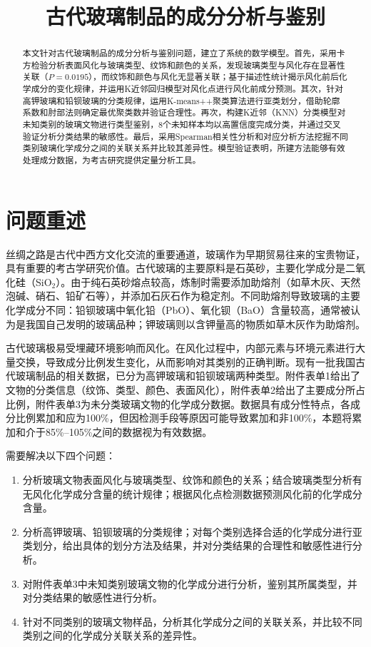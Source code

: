 \documentclass{cumcmthesis}
\title{古代玻璃制品的成分分析与鉴别}
\begin{document}
\maketitle

\begin{abstract}
本文针对古代玻璃制品的成分分析与鉴别问题，建立了系统的数学模型。首先，采用卡方检验分析表面风化与玻璃类型、纹饰和颜色的关系，发现玻璃类型与风化存在显著性关联（$P=0.0195$），而纹饰和颜色与风化无显著关联；基于描述性统计揭示风化前后化学成分的变化规律，并运用K近邻回归模型对风化点进行风化前成分预测。其次，针对高钾玻璃和铅钡玻璃的分类规律，运用K-means++聚类算法进行亚类划分，借助轮廓系数和肘部法则确定最优聚类数并验证合理性。再次，构建K近邻（KNN）分类模型对未知类别的玻璃文物进行类型鉴别，8个未知样本均以高置信度完成分类，并通过交叉验证分析分类结果的敏感性。最后，采用Spearman相关性分析和对应分析方法挖掘不同类别玻璃化学成分之间的关联关系并比较其差异性。模型验证表明，所建方法能够有效处理成分数据，为考古研究提供定量分析工具。

\end{abstract}


\section{问题重述}

丝绸之路是古代中西方文化交流的重要通道，玻璃作为早期贸易往来的宝贵物证，具有重要的考古学研究价值。古代玻璃的主要原料是石英砂，主要化学成分是二氧化硅（SiO$_2$）。由于纯石英砂熔点较高，炼制时需要添加助熔剂（如草木灰、天然泡碱、硝石、铅矿石等），并添加石灰石作为稳定剂。不同助熔剂导致玻璃的主要化学成分不同：铅钡玻璃中氧化铅（PbO）、氧化钡（BaO）含量较高，通常被认为是我国自己发明的玻璃品种；钾玻璃则以含钾量高的物质如草木灰作为助熔剂。

古代玻璃极易受埋藏环境影响而风化。在风化过程中，内部元素与环境元素进行大量交换，导致成分比例发生变化，从而影响对其类别的正确判断。现有一批我国古代玻璃制品的相关数据，已分为高钾玻璃和铅钡玻璃两种类型。附件表单1给出了文物的分类信息（纹饰、类型、颜色、表面风化），附件表单2给出了主要成分所占比例，附件表单3为未分类玻璃文物的化学成分数据。数据具有成分性特点，各成分比例累加和应为100\%，但因检测手段等原因可能导致累加和非100\%，本题将累加和介于85\%--105\%之间的数据视为有效数据。

需要解决以下四个问题：
\begin{enumerate}
    \item 分析玻璃文物表面风化与玻璃类型、纹饰和颜色的关系；结合玻璃类型分析有无风化化学成分含量的统计规律；根据风化点检测数据预测风化前的化学成分含量。
    \item 分析高钾玻璃、铅钡玻璃的分类规律；对每个类别选择合适的化学成分进行亚类划分，给出具体的划分方法及结果，并对分类结果的合理性和敏感性进行分析。
    \item 对附件表单3中未知类别玻璃文物的化学成分进行分析，鉴别其所属类型，并对分类结果的敏感性进行分析。
    \item 针对不同类别的玻璃文物样品，分析其化学成分之间的关联关系，并比较不同类别之间的化学成分关联关系的差异性。
\end{enumerate}
\end{document}
